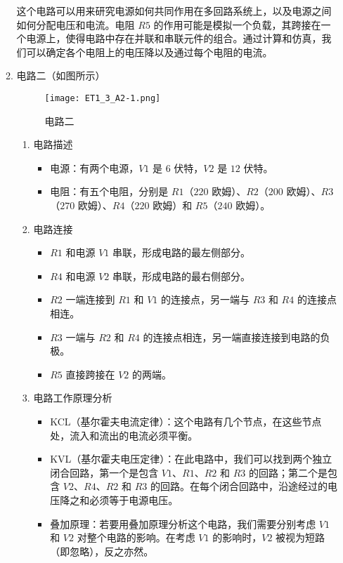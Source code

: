 \documentclass[dvipsnames, svgnames,a4paper,11pt]{article}
\begin{document}
\begin{enumerate}
\begin{enumerate}
			这个电路可以用来研究电源如何共同作用在多回路系统上，以及电源之间如何分配电压和电流。电阻 $R5$ 的作用可能是模拟一个负载，其跨接在一个电源上，使得电路中存在并联和串联元件的组合。通过计算和仿真，我们可以确定各个电阻上的电压降以及通过每个电阻的电流。
			
			\item 电路二（如图所示）
			
			\begin{figure}[htbp]
				\centering
				\texttt{[image: ET1\_3\_A2-1.png]}
				\caption{电路二}
				\label{fig:fig2-1}
			\end{figure}
			
			\begin{enumerate}
				\item 电路描述
				
				\begin{itemize}
					\item 电源：有两个电源，$V1$ 是 $6$ 伏特，$V2$ 是 $12$ 伏特。
					\item 电阻：有五个电阻，分别是 $R1$（$220$ 欧姆）、$R2$（$200$ 欧姆）、$R3$（$270$ 欧姆）、$R4$（$220$ 欧姆）和 $R5$（$240$ 欧姆）。
				\end{itemize}
				
				\item 电路连接
				
				\begin{itemize}
					\item $R1$ 和电源 $V1$ 串联，形成电路的最左侧部分。
					\item $R4$ 和电源 $V2$ 串联，形成电路的最右侧部分。
					\item $R2$ 一端连接到 $R1$ 和 $V1$ 的连接点，另一端与 $R3$ 和 $R4$ 的连接点相连。
					\item $R3$ 一端与 $R2$ 和 $R4$ 的连接点相连，另一端直接连接到电路的负极。
					\item $R5$ 直接跨接在 $V2$ 的两端。
				\end{itemize}
				
				\item 电路工作原理分析
				
				\begin{itemize}
					\item KCL（基尔霍夫电流定律）：这个电路有几个节点，在这些节点处，流入和流出的电流必须平衡。
					\item KVL（基尔霍夫电压定律）：在此电路中，我们可以找到两个独立闭合回路，第一个是包含 $V1$、$R1$、$R2$ 和 $R3$ 的回路；第二个是包含 $V2$、$R4$、$R2$ 和 $R3$ 的回路。在每个闭合回路中，沿途经过的电压降之和必须等于电源电压。
					\item 叠加原理：若要用叠加原理分析这个电路，我们需要分别考虑 $V1$ 和 $V2$ 对整个电路的影响。在考虑 $V1$ 的影响时，$V2$ 被视为短路（即忽略），反之亦然。
				\end{itemize}
			\end{enumerate}
			

\end{enumerate}
\end{enumerate}
\end{document}
